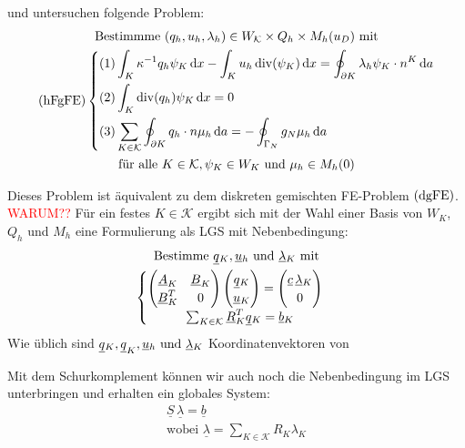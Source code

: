 und untersuchen folgende Problem:
\begin{gather*}
	\text{Bestimmme } (q_h,u_h, \lambda_h) \in W_\mathcal{K} \times Q_h \times M_h(u_D) \text{ mit}\\
	\operatorname{(hF gFE)}\begin{dcases}
		(1) \int_K \kappa^{-1} q_h \psi_K \mathop{}\!\mathrm{d} x - \int_K u_h \operatorname{div}(\psi_K) \mathop{}\!\mathrm{d} x = \oint_{\partial K} \lambda_h \psi_K \cdot n^K \mathop{}\!\mathrm{d} a \\
		(2) \int_K \operatorname{div}(q_h) \psi_K \mathop{}\!\mathrm{d} x = 0\\
		(3) \sum_{K\in \mathcal{K}} \oint_{\partial K} q_h \cdot n \mu_h \mathop{}\!\mathrm{d} a = - \oint_{\Gamma_N} g_N \mu_h \mathop{}\!\mathrm{d} a
	\end{dcases}\\
	\text{für alle } K \in \mathcal{K}, \psi_K \in W_K  \text{ und } \mu_h \in M_h(0)
\end{gather*}

Dieses Problem ist äquivalent zu dem diskreten gemischten FE-Problem $ \operatorname{(dgFE)} $. \textcolor{red}{WARUM??} Für ein festes $ K \in \mathcal{K} $ ergibt sich mit der Wahl einer Basis von $ W_K $, $ Q_h $ und $ M_h $ eine Formulierung als LGS mit Nebenbedingung:
\begin{gather*}
	\text{Bestimme } \underline{q}{}_K, \underline{u}{}_h \text{ und } \underline{\lambda}{}_K \text{ mit}\\
	\begin{cases}
		\begin{pmatrix}
			\underline{A}_K & \underline{B}_K \\
			\underline{B}_K^T & 0
		\end{pmatrix}
		\begin{pmatrix}
			\underline{q}{}_K\\
			\underline{u}{}_K
		\end{pmatrix}
		= \begin{pmatrix}
			\underline{c} \, \underline{\lambda}{}_K \\
			0
		\end{pmatrix}\\
		\qquad \quad \sum_{K \in \mathcal{K}} \underline{R}_K^T \underline{q}{}_K = \underline{b}{}_K		
	\end{cases}
\end{gather*}  
Wie üblich sind $ \underline{q}{}_K, \underline{q}_K, \underline{u}{}_h \text{ und } \underline{\lambda}{}_K $ Koordinatenvektoren von 

Mit dem Schurkomplement können wir auch noch die Nebenbedingung im LGS unterbringen und erhalten ein globales System:
\begin{gather*}
	\underline{S} \, \underline{\lambda} = \underline{b}\\
	\text{wobei } \underline{\lambda} = \sum_{K \in \mathcal{K}} R_K \lambda_K
\end{gather*}
	



